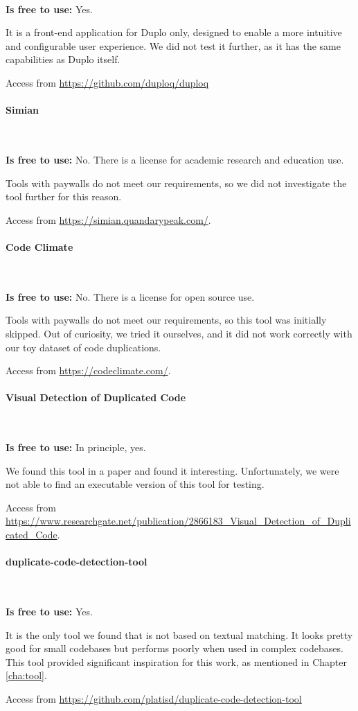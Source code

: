 \

\textbf{Is free to use:} Yes.

It is a front-end application for Duplo only, designed to 
enable a more intuitive and configurable user experience. 
We did not test it further, as it has the same capabilities 
as Duplo itself.

Access from
\url{https://github.com/duploq/duploq}

\paragraph{Simian} 

\

\textbf{Is free to use:} No. 
There is a license for academic research and education use.

Tools with paywalls do not meet our requirements, 
so we did not investigate the tool further for this reason.

Access from
\url{https://simian.quandarypeak.com/}.

\paragraph{Code Climate}

\

\textbf{Is free to use:} No. 
There is a license for open source use.

Tools with paywalls do not meet our requirements, so this 
tool was initially skipped. Out of curiosity, we tried it 
ourselves, and it did not work correctly with our toy
dataset of code duplications.

Access from
\url{https://codeclimate.com/}.

\paragraph{Visual Detection of Duplicated Code}

\

\textbf{Is free to use:} In principle, yes.

We found this tool in a paper and found it interesting. 
Unfortunately, we were not able to find an executable 
version of this tool for testing.

Access from
\url{https://www.researchgate.net/publication/2866183_Visual_Detection_of_Duplicated_Code}.

\paragraph{duplicate-code-detection-tool}

\

\textbf{Is free to use:} Yes.

It is the only tool we found that is not based on textual 
matching. It looks pretty good for small codebases but 
performs poorly when used in complex codebases. This tool 
provided significant inspiration for this work, as 
mentioned in Chapter \ref{cha:tool}.

Access from
\url{https://github.com/platisd/duplicate-code-detection-tool}



